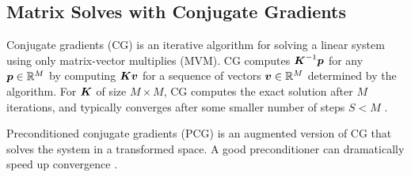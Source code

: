 \iffalse
Observe that \circled{$a_n$} and \circled{b} are both functions of the
$M\times M$ Gram matrix over inducing points, $\bK_{\bu,\bu}$,
where $\left( \bK_{\bu,\bu} \right)_{i,j} \triangleq k(\bar{x}_i, \bar{x}_j)$.
Note this is an alternative derivation of the same objective presented in
\citet{hensman2013gaussian}.
\fi


\subsection{Matrix Solves with Conjugate Gradients}
Conjugate gradients (CG) is an iterative algorithm for solving a linear
system using only matrix-vector multiplies (MVM).
CG computes $\boldsymbol{K}^{-1} \boldsymbol{p}$ for any $\boldsymbol{p} \in \mathbb{R}^M$ by computing
$\boldsymbol{K} \boldsymbol{v}$ for a sequence of vectors $\boldsymbol{v} \in \mathbb{R}^M$ determined by the algorithm.
For $\boldsymbol{K}$ of size $M \times M$, CG computes the exact solution after $M$
iterations,
and typically converges after some smaller number of steps $S < M$
\citep{hestenes1952methods, nocedal2006numerical}.

Preconditioned conjugate gradients (PCG) is an augmented version of CG that
solves the system in a transformed space.  A good preconditioner can
dramatically speed up convergence \citep{shewchuk1994introduction,
cutajar2016preconditioning}.
